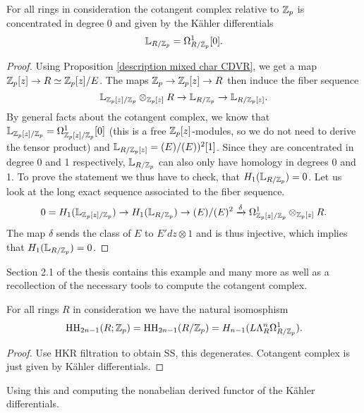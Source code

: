 \begin{lem}
    For all rings in consideration the cotangent complex relative to $\mathbb{Z}_p$ is concentrated in degree 0 and given by the Kähler differentials
    \begin{equation*}
        \mathbb{L}_{R/\mathbb{Z}_p}=\Omega^1_{R/\mathbb{Z}_p}[0].
    \end{equation*}
\end{lem}
\begin{proof}
    Using Proposition \ref{description mixed char CDVR}, we get a map $\mathbb{Z}_p[z]\to R\simeq \mathbb{Z}_p[z]/E$. 
    The maps $\mathbb{Z}_p\to \mathbb{Z}_p[z]\to R$ then induce the fiber sequence
    \begin{equation*}
        \mathbb{L}_{\mathbb{Z}_p[z]/\mathbb{Z}_p}\otimes_{\mathbb{Z}_p[z]}R\to \mathbb{L}_{R/\mathbb{Z}_p}\to \mathbb{L}_{R/\mathbb{Z}_p[z]}.
    \end{equation*}
    By general facts about the cotangent complex, we know that $\mathbb{L}_{\mathbb{Z}_p[z]/\mathbb{Z}_p}=\Omega^1_{\mathbb{Z}_p[z]/\mathbb{Z}_p}[0]$ (this is a free $\mathbb{Z}_p[z]$-modules, so we do not need to derive the tensor product) and $\mathbb{L}_{R/\mathbb{Z}_p[z]}=(E)/(E))^2[1]$.
    Since they are concentrated in degree 0 and 1 respectively, $\mathbb{L}_{R/\mathbb{Z}_p}$ can also only have homology in degrees 0 and 1. To prove the statement we thus have to check, that $H_1(\mathbb{L}_{R/\mathbb{Z}_p})=0$. Let us look at the long exact sequence associated to the fiber sequence.
    \begin{equation*}
        0=H_1(\mathbb{L}_{\mathbb{Z}_p[z]/\mathbb{Z}_p})\to H_1(\mathbb{L}_{R/\mathbb{Z}_p})\to (E)/(E)^2 \xrightarrow{\delta} \Omega^1_{\mathbb{Z}_p[z]/\mathbb{Z}_p}\otimes_{\mathbb{Z}_p[z]}R.
    \end{equation*} 
    The map $\delta$ sends the class of $E$ to $E'dz\otimes 1$ and is thus injective, which implies that $H_1(\mathbb{L}_{R/\mathbb{Z}_p})=0$.
\end{proof}
Section 2.1 of the thesis \cite{OnderiveddeRhamcohomoology} contains this example and many more as well as a recollection of the necessary tools to compute the cotangent complex.

\begin{prop}
    For all rings $R$ in consideration we have the natural isomosphism 
    \begin{equation*}
        \operatorname{HH}_{2n-1}(R;\mathbb{Z}_p)=\operatorname{HH}_{2n-1}(R/\mathbb{Z}_p)=H_{n-1}(L\Lambda^{n}_R \Omega^1_{R/\mathbb{Z}_p}).
    \end{equation*} 
\end{prop}
\begin{proof}
    Use HKR filtration to obtain SS, this degenerates. Cotangent complex is just given by Kähler differentials. 
\end{proof}
Using this and computing the nonabelian derived functor of the Kähler differentials.


